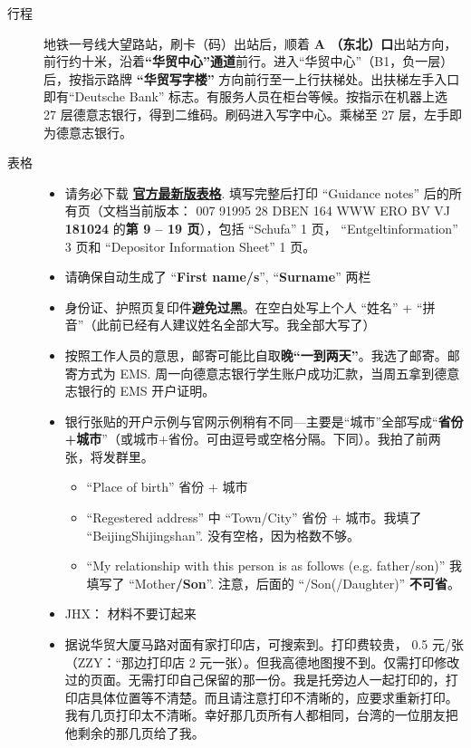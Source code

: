 \documentclass[oneside,final]{book}
\begin{document}
\begin{appendices}
\begin{description}
\begin{figure}[htbp]
  \label{fig:email}
\end{figure}
\item[行程] 地铁一号线大望路站，刷卡（码）出站后，顺着 \textbf{\color{blue}A （东北）口}出站方向，前行约十米，沿着\textbf{\color{blue}“华贸中心”通道}前行。进入“华贸中心”（B1，负一层）后，按指示路牌 \textbf{\color{blue}“华贸写字楼”} 方向前行至一上行扶梯处。出扶梯左手入口即有``Deutsche Bank'' 标志。有服务人员在柜台等候。按指示在机器上选 27 层德意志银行，得到二维码。刷码进入写字中心。乘梯至 27 层，左手即为德意志银行。
\item[表格]
\begin{itemize}
  \item 请务必下载 \href{https://china.db.com/china/docs/1.opening\_a\_bank\_account\_for\_foreign\_students\_over18years.pdf}{\textbf{\color{blue}官方最新版表格}}. 填写完整后打印 ``Guidance notes'' 后的所有页（文档当前版本：
  007 91995 28 DBEN 164 WWW ERO BV VJ \textbf{\color{blue}181024} 的\textbf{\color{blue}第 9 -- 19 页}），包括 ``Schufa'' 1 页， ``Entgeltinformation'' 3 页和 ``Depositor Information Sheet'' 1 页。 
  \item 请确保自动生成了 ``\textbf{\color{blue}First name/s}'', ``\textbf{\color{blue}Surname}'' 两栏
  \item 身份证、护照页复印件\textbf{避免过黑}。在空白处写上个人 “姓名” + “拼音”（此前已经有人建议姓名全部大写。我全部大写了）
  \item 按照工作人员的意思，邮寄可能比自取\textbf{\color{blue}晚“一到两天”}。我选了邮寄。邮寄方式为 EMS. 周一向德意志银行学生账户成功汇款，当周五拿到德意志银行的 EMS 开户证明。
  \item 银行张贴的开户示例与官网示例稍有不同---主要是“城市”全部写成“\textbf{\color{blue}省份+城市}”（或城市+省份。可由逗号或空格分隔。下同）。我拍了前两张，将发群里。
  \begin{itemize}
    \item ``Place of birth'' 省份 + 城市
    \item ``Regestered address'' 中 ``Town/City'' 省份 + 城市。我填了 ``BeijingShijingshan''. 没有空格，因为格数不够。
    \item ``My relationship with this person is as follows (e.g. father/son)'' 我填写了 ``Mother\textbf{\color{blue}/Son}''. 注意，后面的 ``/Son(/Daughter)'' \textbf{\color{blue}不可省}。
  \end{itemize}
\item JHX： 材料不要订起来
\item 据说华贸大厦马路对面有家打印店，可搜索到。打印费较贵， 0.5 元/张（ZZY：“那边打印店 2 元一张）。但我高德地图搜不到。仅需打印修改过的页面。{\color{blue}无需打印自己保留的那一份}。我是托旁边人一起打印的，打印店具体位置等不清楚。而且请注意{\color{blue}打印不清晰的，应要求重新打印}。我有几页打印太不清晰。幸好那几页所有人都相同，台湾的一位朋友把他剩余的那几页给了我。

\end{itemize}
\end{description}
\end{appendices}
\end{document}
